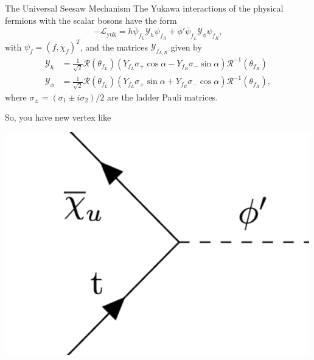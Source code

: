 \documentclass{../bredelebeamer}
\begin{document}
\begin{frame}{{The Universal Seesaw Mechanism}}
	The Yukawa interactions of the physical fermions with the scalar bosons have the form
\begin{equation}
    -\mathcal{L}_{\text{yuk}} 
    = h \bar\psi_{f_L} \mathcal{Y}_{h}\psi_{f_R} + \phi' \bar\psi_{f_L} \mathcal{Y}_{\phi}\psi_{f_R},
\end{equation} 
with $\psi_{f} = (f,\chi_{f})^T$, and the matrices $\mathcal{Y}_{f_{L,R}}$ given by
\begin{align}
    \mathcal{Y}_{h} &= \frac{1}{\sqrt{2}}
    \mathcal{R}(\theta_{f_L})
    \left(
        Y_{f_L}\sigma_+ \cos\alpha 
    - 
    Y_{f_R}\sigma_-\sin\alpha
    \right)
    \mathcal{R}^{-1}(\theta_{f_R})\label{eq:YukawaL}
    \\
    \mathcal{Y}_{\phi} &= \frac{1}{\sqrt{2}}
    \mathcal{R}(\theta_{f_L})
    \left(
    Y_{f_L}\sigma_+ \sin\alpha
    +
    Y_{f_R}\sigma_-\cos\alpha
    \right)
    \mathcal{R}^{-1}(\theta_{f_R}),\label{eq:YukawaR}
\end{align}
where $\sigma_{\pm}=(\sigma_1\pm i\sigma_2)/2$ are the ladder Pauli matrices.


So, you have new vertex like 
\begin{center}
	\includegraphics[height=0.3\textheight]{seesaw.png}
\end{center}
\end{frame}
\end{document}
